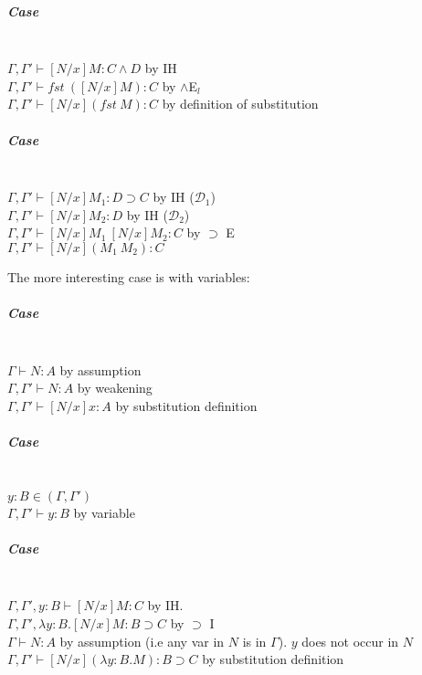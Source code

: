 \documentclass[12 pt]{article}
\begin{document}
	\subparagraph{Case}
	\noLine
	\DP
	\\ $\Gamma, \Gamma ' \vdash [N/x] M : C\land D$ by IH
	\\ $\Gamma, \Gamma ' \vdash fst\ ([N/x]M) : C$ by $\land$E$_l$
	\\$\Gamma, \Gamma' \vdash [N/x](fst \ M) : C$ by definition of substitution
\subparagraph{Case}
\noLine
{}

\noLine
{}
\DP
\\ $\Gamma, \Gamma ' \vdash [N/x] M_1 : D \supset C$ by IH ($\mathcal{D}_1$)
\\ $\Gamma, \Gamma ' \vdash [N/x] M_2 : D$ by IH ($\mathcal{D}_2$)
\\$\Gamma, \Gamma' \vdash [N/x]M_1 \ [N/x]M_2 : C$ by $\supset$ E
	\\ $\Gamma, \Gamma' \vdash [N/x](M_1\ M_2) : C$

	The more interesting case is with variables:
	\subparagraph{Case}

	\DP
	\\ $\Gamma \vdash N:A$ by assumption
	\\ $\Gamma, \Gamma' \vdash N : A$ by weakening
	\\ $\Gamma, \Gamma' \vdash [N/x]x : A$ by substitution definition
	\subparagraph{Case}

	\DP
	\\ $y:B \in (\Gamma, \Gamma')$
	\\ $\Gamma, \Gamma' \vdash y : B$ by variable
	\subparagraph{Case}

	\DP
	\\ $\Gamma, \Gamma', y:B \vdash [N/x] M:C$ by IH.
	\\ $\Gamma, \Gamma', \lambda y : B . [N/x] M: B \supset C$ by $\supset$ I
	\\ $\Gamma \vdash N : A$ by assumption (i.e any var in $N$ is in
$\Gamma$). $y$ does not occur in $N$
	\\ $\Gamma, \Gamma ' \vdash [N/x] (\lambda y:B.M) : B \supset C$
	by substitution definition
\end{document}
